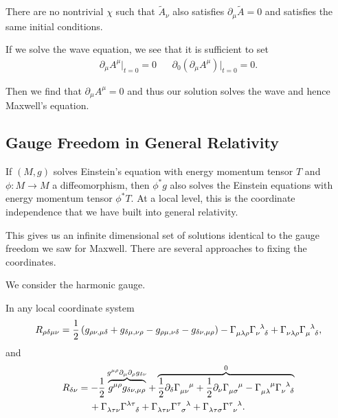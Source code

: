 
There are no nontrivial $\chi$ such that $\widetilde{A}_\nu$ also satisfies $\partial_\mu \widetilde{A} =0$ and satisfies the same initial conditions.

If we solve the wave equation, we see that it is sufficient to set
\begin{align}
    \partial_\mu A^{\mu} \bigg|_{t = 0} = 0 && \partial_0 \left( \partial_\mu A^{\mu} \right) \bigg|_{t = 0} = 0
.\end{align}

Then we find that $\partial_\mu A^{\mu} = 0$ and thus our solution solves the wave and hence Maxwell's equation.


\subsection{Gauge Freedom in General Relativity}


If $\left( M,g \right) $ solves Einstein's equation with energy momentum tensor $T$ and $\phi : M \to M$ a diffeomorphism, then $\phi^{*} g$ also solves the Einstein equations with energy momentum tensor $\phi^{*} T$. At a local level, this is the coordinate independence that we have built into general relativity.

This gives us an infinite dimensional set of solutions identical to the gauge freedom we saw for Maxwell. There are several approaches to fixing the coordinates. 

We consider the harmonic gauge.

\begin{lemma}
    In any local coordinate system
    \begin{align}
        R_{\rho \delta \mu \nu} = \frac{1}{2} \left( g_{\rho \nu , \mu \delta} + g_{\delta \mu , \nu \rho} - g_{\rho \mu, \nu \delta} - g_{\delta \nu, \mu \rho} \right) - \tensor{\Gamma}{_{\mu \lambda \rho}} \tensor{\Gamma}{_\nu^{\lambda}_{\delta}} + \tensor{\Gamma}{_{\nu \lambda \rho}} \tensor{\Gamma}{_{\mu}^{\lambda}_\delta}
    ,\end{align}
    and 
    \begin{align}
        R_{\delta \nu} &= -\frac{1}{2} \overbrace{g^{\mu \rho} g_{\delta \nu , \mu \rho}}^{g^{\mu \rho} \partial_\mu \partial_\rho  g_{\delta \nu}} + \overbrace{\frac{1}{2} \partial_\delta \tensor{\Gamma}{_{\mu \nu}^{\mu}} + \frac{1}{2} \partial_\nu \tensor{\Gamma}{_{\mu \sigma}^{\mu}} - \tensor{\Gamma}{_{\mu \lambda}^{\mu}} \tensor{\Gamma}{_\nu^{\lambda}_\delta}}^{0} \nonumber\\
        &\quad \, + \tensor{\Gamma}{_{\lambda \tau \nu}} \tensor{\Gamma}{^{\lambda \tau}_{\delta}} + \tensor{\Gamma}{_{\lambda \tau \nu}} \tensor{\Gamma}{^{\tau}_\sigma^{\lambda}} + \tensor{\Gamma}{_{\lambda \tau \sigma}} \tensor{\Gamma}{^{\tau}_{\nu}^{\lambda}} 
    .\end{align}
\end{lemma}


